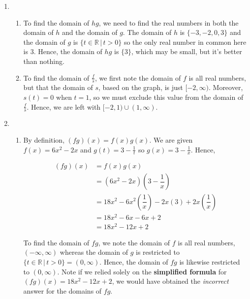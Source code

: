 \begin{ex}
\begin{enumerate}
\begin{enumerate}
\end{enumerate}

\item \begin{enumerate}

\item To find the domain of $hg$, we need to find the real numbers in both the domain of $h$ and the domain of $g$.  The domain of $h$ is $\{ -3, -2, 0, 3 \}$ and the domain of $g$ is $\{ t \in \mathbb{R} \, | \, t > 0 \}$ so the only real number in common here is $3$.  Hence, the domain of $hg$ is $\{ 3\}$, which may be small, but it's better than nothing.

\item To find the domain of $\frac{f}{s}$, we first note the domain of $f$ is all real numbers, but that the domain of $s$, based on the graph, is just $[-2, \infty)$.  Moreover, $s(t) = 0$ when $t=1$, so we must exclude this value from the domain of $\frac{f}{s}$.  Hence, we are left with $[-2, 1) \cup (1, \infty)$.

\end{enumerate}

\item  

\begin{enumerate}

\item  By definition, $(fg)(x) = f(x)g(x)$.  We are given $f(x) = 6x^2-2x$ and $g(t) = 3 - \frac{1}{t}$ so $g(x) = 3 - \frac{1}{x}$.  Hence, 

\begin{align*}
(fg)(x) & = f(x)g(x) \\
           & = \left( 6x^2-2x \right) \left( 3 - \dfrac{1}{x} \right) \\
           & = 18x^2 - 6x^2 \left(\dfrac{1}{x}\right) - 2x(3) + 2x \left(\dfrac{1}{x}\right)  \tag{distribute} \\
           & = 18x^2 - 6x - 6x + 2 \\
           & = 18x^2 - 12x + 2
\end{align*}
           
To find the domain of $fg$, we note the domain of $f$ is all real numbers, $(-\infty, \infty)$ whereas the domain of $g$ is restricted to $\{ t \in \mathbb{R} \, | \, t > 0 \} = (0, \infty)$.  Hence, the domain of $fg$ is likewise restricted to $(0, \infty)$.  Note if we relied solely on the \textbf{simplified formula} for $(fg)(x) = 18x^2 - 12x + 2$, we would have obtained the \textit{incorrect} answer for the domains of $fg$.  


\end{enumerate}
\end{enumerate}
\end{ex}
